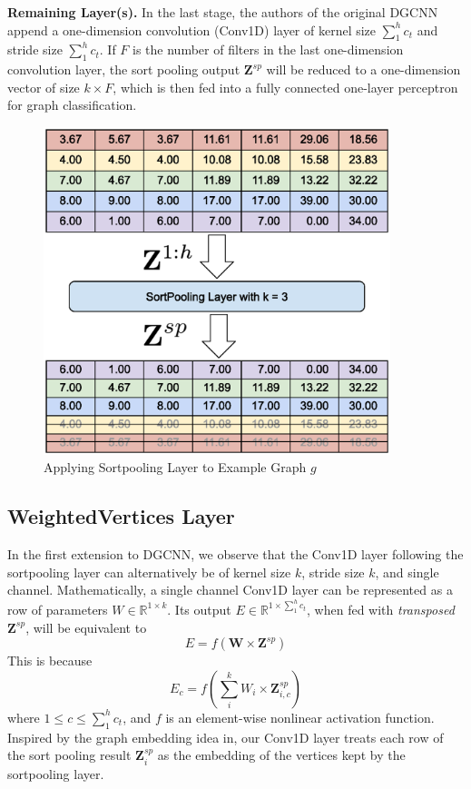 \textbf{Remaining Layer(s).} In the last stage, the authors of the original DGCNN\cite{Dgcnn} append a one-dimension convolution (Conv1D) layer of kernel size $\sum_{1}^{h}c_t$ and stride size $\sum_{1}^{h}c_t$.
If $F$ is the number of filters in the last one-dimension convolution layer, the sort pooling output $\mathbf{Z}^{sp}$ will be reduced to a one-dimension vector of size $k \times F$, which is then fed into a fully connected one-layer perceptron for graph classification.

\begin{figure}[htbp]
    \centerline{\includegraphics[width=0.90\textwidth]{Magic/figures/ExampleSortpool.eps}}
    \caption{Applying Sortpooling Layer to Example Graph $g$}
    \label{MG:Fig:ExampleSortpool}
\end{figure}

\subsection{WeightedVertices Layer}
In the first extension to DGCNN, we observe that the Conv1D layer following the sortpooling layer can alternatively be of kernel size $k$, stride size $k$, and single channel.
Mathematically, a single channel Conv1D layer can be represented as a row of parameters $W \in \mathbb{R}^{1 \times k}$.
Its output $E \in \mathbb{R}^{1 \times \sum_{1}^{h}c_t}$, when fed with \textit{transposed} $\mathbf{Z}^{sp}$, will be equivalent to
\begin{equation}
    E = f(\mathbf{W} \times \mathbf{Z}^{sp})
    \label{MG:Equ:WeightedVertices}
\end{equation}
This is because
\begin{equation}
    E_c = f(\sum_{i}^{k} W_i \times \mathbf{Z}^{sp}_{i, c})
\end{equation}
where $1\leq c \leq \sum_{1}^{h}c_t$, and $f$ is an element-wise nonlinear activation function.
Inspired by the graph embedding idea in\cite{GraphEmbedding}, our Conv1D layer treats each row of the sort pooling result $\mathbf{Z}^{sp}_{i}$ as the embedding of the vertices kept by the sortpooling layer.

